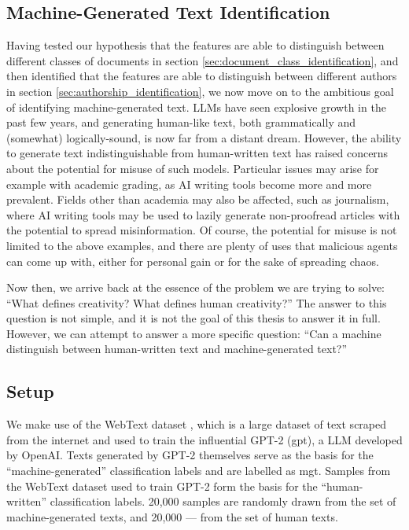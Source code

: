 \subsection{Machine-Generated Text Identification}
Having tested our hypothesis that the features are able to distinguish between different classes of documents in section \ref{sec:document_class_identification}, and then identified that the features are able to distinguish between different authors in section \ref{sec:authorship_identification}, we now move on to the ambitious goal of identifying machine-generated text. LLMs have seen explosive growth in the past few years, and generating human-like text, both grammatically and (somewhat) logically-sound, is now far from a distant dream. However, the ability to generate text indistinguishable from human-written text has raised concerns about the potential for misuse of such models. Particular issues may arise for example with academic grading, as AI writing tools become more and more prevalent. Fields other than academia may also be affected, such as journalism, where AI writing tools may be used to lazily generate non-proofread articles with the potential to spread misinformation. Of course, the potential for misuse is not limited to the above examples, and there are plenty of uses that malicious agents can come up with, either for personal gain or for the sake of spreading chaos.

Now then, we arrive back at the essence of the problem we are trying to solve: ``What defines creativity? What defines human creativity?'' The answer to this question is not simple, and it is not the goal of this thesis to answer it in full. However, we can attempt to answer a more specific question: ``Can a machine distinguish between human-written text and machine-generated text?''

\subsection*{Setup}
We make use of the WebText dataset \citep{radford2019_gpt2}, which is a large dataset of text scraped from the internet and used to train the influential GPT-2 (\acrlong{gpt}), a LLM developed by OpenAI. Texts generated by GPT-2 themselves serve as the basis for the ``machine-generated'' classification labels and are labelled as \acrfull{mgt}. Samples from the WebText dataset used to train GPT-2 form the basis for the ``human-written'' classification labels. 20,000 samples are randomly drawn from the set of machine-generated texts, and 20,000 --- from the set of human texts.

